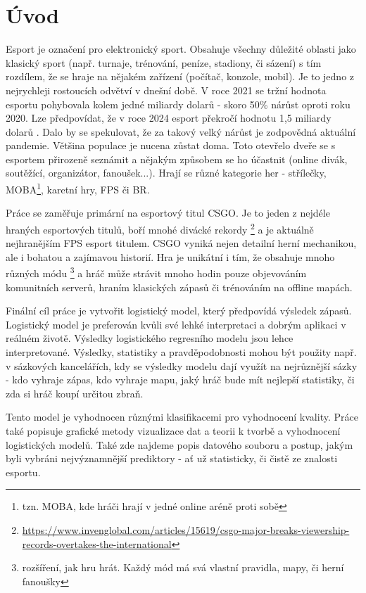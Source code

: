 \chapter{Úvod}
Esport je označení pro elektronický sport. Obsahuje všechny důležité oblasti jako klasický sport (např. turnaje, trénování, peníze, stadiony, či sázení)
s tím rozdílem, že se hraje na nějakém zařízení (počítač, konzole, mobil).
Je to jedno z nejrychleji rostoucích odvětví v dnešní době. V roce 2021 se tržní hodnota esportu pohybovala kolem jedné miliardy dolarů - skoro
50\% nárůst oproti roku 2020. Lze předpovídat, že v roce 2024 esport překročí hodnotu 1,5 miliardy dolarů \cite{Gough2021}.
Dalo by se spekulovat, že za takový velký nárůst je zodpovědná aktuální pandemie. Většina populace je nucena zůstat doma. Toto otevřelo dveře
se s esportem přirozeně seznámit a nějakým způsobem se ho účastnit (online divák, soutěžící, organizátor, fanoušek...). 
Hrají se různé kategorie her - střílečky, \ac{MOBA}\footnote{tzn. MOBA, kde hráči hrají v jedné online aréně proti sobě}, karetní hry, \ac{FPS} či \ac{BR}.

Práce se zaměřuje primární na esportový titul \acf{CSGO}. Je to jeden z nejdéle hraných esportových titulů, boří mnohé divácké rekordy
\footnote{\url{https://www.invenglobal.com/articles/15619/csgo-major-breaks-viewership-records-overtakes-the-international}}
a je aktuálně nejhranějším \ac{FPS} esport titulem.
\ac{CSGO} vyniká nejen detailní herní mechanikou, ale i bohatou a zajímavou historií. Hra je unikátní i tím,
že obsahuje mnoho různých módu
\footnote{rozšíření, jak hru hrát. Každý mód má svá vlastní pravidla, mapy, či herní fanoušky} a hráč může strávit mnoho hodin pouze objevováním komunitních serverů,
hraním klasických zápasů či trénováním na offline mapách.

Finální cíl práce je vytvořit logistický model, který předpovídá výsledek zápasů. Logistický model je preferován kvůli své lehké interpretaci a 
dobrým aplikaci v reálném životě. Výsledky logistického regresního modelu jsou lehce interpretované. Výsledky, statistiky a pravděpodobnosti mohou
být použity např. v sázkových kancelářích, kdy se výsledky modelu dají využít na nejrůznější sázky - kdo vyhraje zápas, kdo vyhraje mapu,
jaký hráč bude mít nejlepší statistiky, či zda si hráč koupí určitou zbraň.

Tento model je vyhodnocen různými klasifikacemi pro vyhodnocení kvality.
Práce také popisuje grafické metody vizualizace dat a teorii k tvorbě a vyhodnocení logistických modelů. Také zde najdeme popis datového souboru a postup,
jakým byli vybráni nejvýznamnější prediktory - ať už statisticky, či čistě ze znalosti esportu. 
